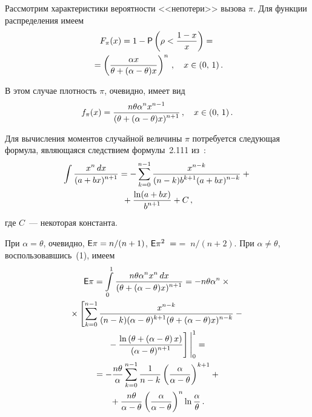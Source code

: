 \begin{multicols}{2}
Рассмотрим характеристики вероятности <<непотери>> вызова $\pi$. Для функции распределения имеем
\begin{multline*}
F_\pi(x)=1-{\sf P}\left(\rho<\displaystyle\frac{\displaystyle 1-x\mathstrut}{\displaystyle {x}\mathstrut}\right)={}\\
{}=\left(\displaystyle\frac{\displaystyle \alpha x\mathstrut}{\displaystyle \theta+(\alpha-\theta)x\mathstrut}\right)^n\,,\quad
x\in(0,\, 1)\,.
\end{multline*}

В этом случае плотность $\pi$, очевидно, имеет вид
$$
f_\pi(x)=\displaystyle\frac{\displaystyle n\theta\alpha^n x^{n-1}\mathstrut}{\displaystyle (\theta+(\alpha-\theta)x)^{n+1}\mathstrut}\,,\quad x\in(0,\, 1)\,.
$$

Для вычисления моментов случайной величины $\pi$ потребуется следующая формула, являющаяся следствием формулы~2.111 
из~\cite{5k}:
\begin{multline}
\int\displaystyle\frac{\displaystyle x^n\,
dx\mathstrut}{\displaystyle {(a+bx)^{n+1}}\mathstrut}=-\sum_{k=0}^{n-1}\displaystyle\frac{\displaystyle x^{n-k}\mathstrut}{\displaystyle {(n-k)b^{k+1}(a+bx)^{n-k}}\mathstrut}+{}\\
{}+\displaystyle\frac{\displaystyle \ln(a+bx)\mathstrut}{\displaystyle {b^{n+1}}\mathstrut}
+C\,,
\end{multline}
где $C$~--- некоторая константа.

При $\alpha=\theta$, очевидно, ${\sf E}\pi=n/(n+1)$, ${\sf E}\pi^2\;=$\linebreak $=\;n/(n+2)$. При $\alpha\neq\theta$, воспользовавшись~(1), имеем
\begin{multline*}
\e\pi=\il{0}{1}\fr{n\theta\alpha^n x^n\,
dx}{{(\theta+(\alpha-\theta)x)^{n+1}}}=-n\theta\alpha^n\times{}\\
{}\times
\left[\sum_{k=0}^{n-1}\fr{x^{n-k}}{{(n-k)(\alpha
-\theta)^{k+1}(\theta+(\alpha-\theta)x)^{n-k}}}-{}\right.\\
\left.{}-\fr{\ln \left(\theta+(\alpha-\theta\right) x)}{{(\alpha-\theta)^{n+1}}}
\vphantom{\sum_{k=0}^{n-1}}\right]
\Bigg|_0^1={}\\
{}=-\fr{n\theta}{\alpha}\sum_{k=0}^{n-1}\fr{1}{{n-k}}\left(\fr{\alpha}{{\alpha-\theta}}\right)^{k+1}+{}\\
{}+
\fr{n\theta}{{\alpha-\theta}}\left(\fr{\alpha}{{\alpha-\theta}}\right)^n\ln\fr{\alpha}{\theta}\,.
\end{multline*}


\end{multicols}
